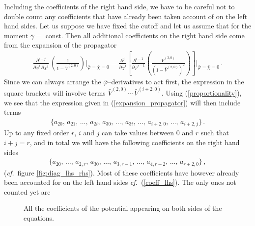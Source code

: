 \documentclass[11pt]{book}
\newcommand\cf{\textit{cf.}\ }
\numberwithin{equation}{chapter}
\begin{document}
Including the coefficients of the right hand side,
we have to be careful not to double count any coefficients that have already been taken account of on the
left hand sides. Let us suppose we have fixed the cutoff and let us assume that for the
moment $\bar{\gamma} =$ const. Then all additional coefficients on the right hand side come from the
expansion of the propagator
\begin{align}
  \label{expansion_propagator}
  \frac{\partial^{i+j}}{\partial \bar\varphi^i \, \partial \bar\chi^j} \, \left( \frac{1}{1 - \bar V^{(2,0)}} \right) \bigg|_{\bar\varphi = \bar\chi = 0} =
  \frac{\partial^{j}}{\partial \bar\chi^j} \left[ \frac{\partial^{i-1}}{\partial \bar\varphi^{i-1}} \left( \frac{\bar V^{(3,0)}}{(1 - \bar V^{(2,0)})^2} \right) \right] \Bigg|_{\bar\varphi = \bar\chi = 0}\, .
\end{align}
Since we can always arrange the $\bar\varphi$--derivatives to act first,
the expression in the square brackets will involve terms $\bar V^{(2,0)} \cdots \, \bar V^{(i+2,0)}$.
Using (\ref{proportionality}), we see that the expression given in (\ref{expansion_propagator}) will
then include terms
\begin{align}
  \bigg\lbrace
  a_{20},\, a_{21},\, \dots ,\, a_{2i},\, a_{30},\, \dots ,\, a_{3i},\, \dots,\, a_{i+2,0},\, \dots,\, a_{i+2,j}
  \bigg\rbrace \,.
\end{align}
Up to any fixed order $r$, $i$ and $j$ can take values between $0$ and $r$ such that $i+j = r$,
and in total we will have the following coefficients on the right hand sides
%     
\begin{align}
  \bigg\lbrace
  a_{20},\, \dots ,\, a_{2,r},\, a_{30},\, \dots ,\, a_{3,r-1},\, \dots ,\, a_{4,r-2},\, \dots,\, a_{r+2,0}
  \bigg\rbrace \,,
\end{align}
(\cf figure \ref{fig:diag_lhs_rhs}).
Most of these coefficients have however already been accounted for on the left hand sides
\cf (\ref{coeff_lhs}). The only ones not counted yet are
\begin{figure}
  \begin{center}
    
  \end{center}
  \caption{
    All the coefficients of the potential appearing on both sides of the equations.
  }
  \label{fig:diag-all}
\end{figure}
\end{document}
